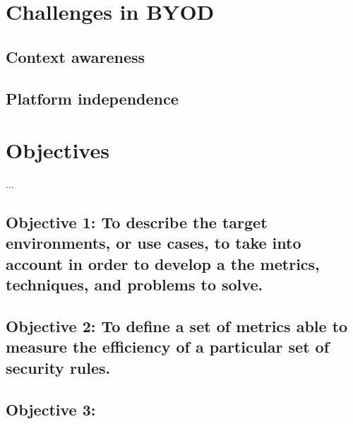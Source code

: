 \section{Challenges in BYOD}
\label{sec:intro:challenges}



\subsection{Context awareness}
\label{subsec:context}


\subsection{Platform independence}
\label{subsec:platf_ind}


\section{Objectives}                     
\label{sec:intro:motivation}

...

\newcommand{\objectivescenarios}{To describe the target environments, or use cases, to take into account in order to develop a the metrics, techniques, and problems to solve.} %

 \subsection*{Objective 1: \objectivescenarios}
\label{subsec:intro:obj:problems}

\newcommand{\objectivemetrics}{To define a set of metrics able to measure the efficiency of a particular set of security rules.}

\subsection*{Objective 2: \objectivemetrics} 
\label{subsec:intro:obj:methodology}

\newcommand{\objectiveframework}{}

\subsection*{Objective 3: \objectiveframework}
\label{subsec:intro:obj:fwork}

